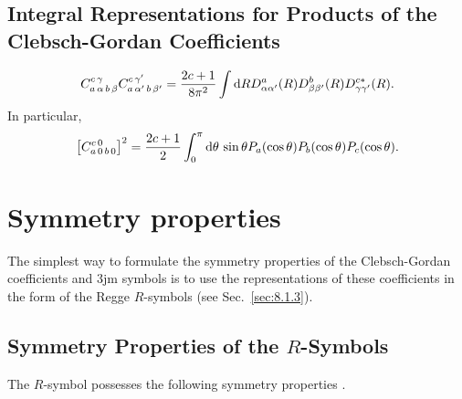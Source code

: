 \subsection{Integral Representations for Products of the Clebsch-Gordan Coefficients}\label{sec:8.3.4}
\begin{equation}
C_{a\,\alpha\,b\,\beta}^{c\,\gamma} C_{a\,\alpha^{\prime}\,b\,\beta^{\prime}}^{c\,\gamma^{\prime}}=\frac{2 c+1}{8 \pi^{2}} \int\mathrm{d} R D_{\alpha \alpha^{\prime}}^{a}(R) D_{\beta \beta^{\prime}}^{b}(R) D_{\gamma \gamma^{\prime}}^{c *}(R). \label{eq:8:3:7}
\end{equation}
In particular,
\begin{equation}
\left[C_{a\,0\,b\,0}^{c\,0}\right]^{2}=\frac{2 c+1}{2} \int_{0}^{\pi}\mathrm{d} \theta\, \sin \theta P_{a}(\cos \theta) P_{b}(\cos \theta) P_{c}(\cos \theta). \label{eq:8:3:8}
\end{equation}

\section{Symmetry properties}\label{sec:8.4}
The simplest way to formulate the symmetry properties of the Clebsch-Gordan coefficients and 3jm symbols is to use the representations of these coefficients in the form of the Regge $R$-symbols \cite{ref094} (see Sec.~\ref{sec:8.1.3}).

\subsection{Symmetry Properties of the $R$-Symbols}\label{sec:8.4.1}
The $R$-symbol possesses the following symmetry properties \cite{ref094}.\\
